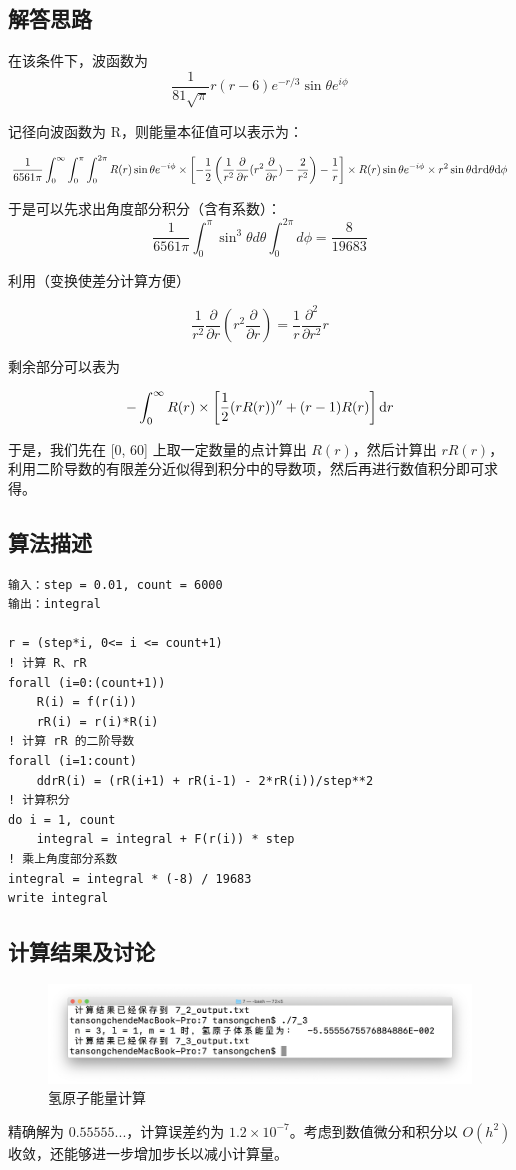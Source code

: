 \documentclass{ctexart}
\begin{document}
\subsection{解答思路}
在该条件下，波函数为
\[
\frac1{81\sqrt \pi}r(r-6)e^{-r/3}\sin\theta e^{i\phi}
\]

记径向波函数为 R，则能量本征值可以表示为：

\[
\frac1{6561\pi}\int_0^\infty\int_0^\pi\int_0^{2\pi} R(r)\sin\theta e^{-i\phi}\times\left[-\frac12\left(\frac1{r^2}\frac{\partial}{\partial r}(r^2\frac{\partial}{\partial r})-\frac2{r^2}\right)-\frac1r\right]\times R(r)\sin\theta e^{-i\phi}\times r^2\sin\theta \mathrm{d} r\mathrm{d}\theta\mathrm{d}\phi
\]

于是可以先求出角度部分积分（含有系数）：
\[
\frac1{6561\pi}\int_{0}^{\pi}\sin^3\theta d\theta\int_0^{2\pi}d\phi=\frac{8}{19683}
\]

利用（变换使差分计算方便）

\[
\frac1{r^2}\frac{\partial}{\partial r}(r^2\frac{\partial}{\partial r})=\frac1r\frac{\partial^2}{\partial r^2}r
\]

剩余部分可以表为

\[
-\int_0^\infty R(r)\times\left[\frac12(rR(r))''+(r-1)R(r)\right]\mathrm{d} r
\]

于是，我们先在 [0, 60] 上取一定数量的点计算出 $R(r)$，然后计算出 $rR(r)$，利用二阶导数的有限差分近似得到积分中的导数项，然后再进行数值积分即可求得。
\subsection{算法描述}
\begin{lstlisting}
输入：step = 0.01, count = 6000
输出：integral

r = (step*i, 0<= i <= count+1)
! 计算 R、rR
forall (i=0:(count+1))
    R(i) = f(r(i))
    rR(i) = r(i)*R(i)
! 计算 rR 的二阶导数
forall (i=1:count)
    ddrR(i) = (rR(i+1) + rR(i-1) - 2*rR(i))/step**2
! 计算积分
do i = 1, count
    integral = integral + F(r(i)) * step
! 乘上角度部分系数
integral = integral * (-8) / 19683
write integral
\end{lstlisting}
\subsection{计算结果及讨论}
\begin{figure}[h]
\centering
\includegraphics[scale = 0.3]{hydrogen.png}
\caption{氢原子能量计算}
\end{figure}
精确解为 $0.55555...$，计算误差约为 $1.2\times 10^{-7}$。考虑到数值微分和积分以 $O(h^2)$ 收敛，还能够进一步增加步长以减小计算量。
\end{document}
